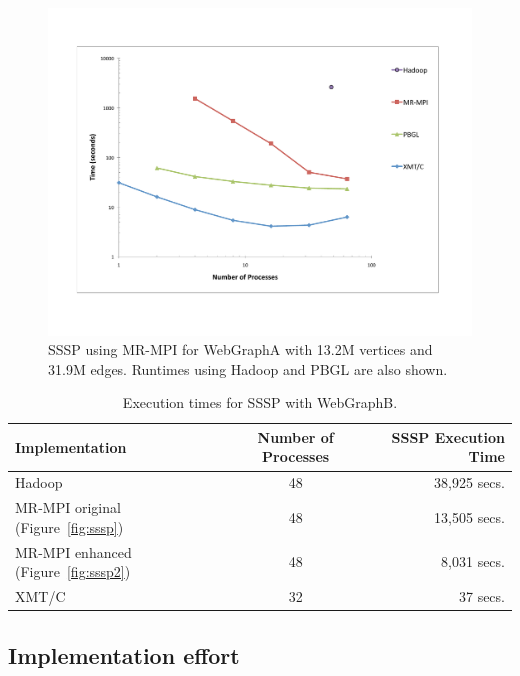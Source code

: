 \begin{figure}[htb]
\includegraphics[width=\textwidth]{fig_ssspA.pdf}
\caption{SSSP using MR-MPI for WebGraphA with
13.2M vertices and 31.9M edges.  Runtimes using Hadoop and PBGL
are also shown.}
\label{f:ssspA}
\end{figure}

\begin{table}
\begin{center}
\begin{tabular}{|l|c|r|}
\hline
Implementation & Number of Processes & SSSP Execution Time \\
\hline
Hadoop & 48  & 38,925 secs.\\
MR-MPI original (Figure~\ref{fig:sssp}) & 48 &  13,505 secs.\\
MR-MPI enhanced (Figure~\ref{fig:sssp2}) & 48 &  8,031 secs.\\
XMT/C  & 32 &  37 secs.\\
\hline
\end{tabular}
\caption{Execution times for SSSP with {WebGraphB}.}
\label{t:ssspB}
\end{center}
\end{table}

\subsection{Implementation effort}

